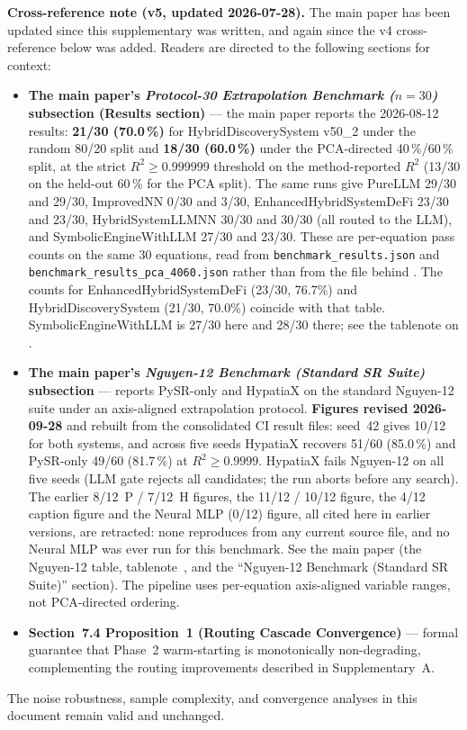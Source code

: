 \documentclass[twoside,11pt]{article}
\newcommand{\Rsq}{R^{2}}
\begin{document}
\medskip
\noindent\textbf{Cross-reference note (v5, updated 2026-07-28).}
The main paper has been updated since this supplementary was written, and
again since the v4 cross-reference below was added. Readers are directed
to the following sections for context:
\begin{itemize}
  \item \textbf{The main paper's \emph{Protocol-30 Extrapolation Benchmark ($n=30$)} subsection (Results section)} --- the main paper
    reports the 2026-08-12 results: \textbf{21/30 (70.0\,\%)} for
    HybridDiscoverySystem v50\_2 under the random 80/20 split and
    \textbf{18/30 (60.0\,\%)} under the PCA-directed 40\,\%/60\,\% split, at
    the strict $\Rsq \geq 0.999999$ threshold on the method-reported $\Rsq$ (13/30 on the
    held-out 60\,\% for the PCA split). The same
    runs give PureLLM 29/30 and 29/30, ImprovedNN 0/30 and 3/30,
    EnhancedHybridSystemDeFi 23/30 and 23/30, HybridSystemLLMNN 30/30 and
    30/30 (all routed to the LLM), and SymbolicEngineWithLLM 27/30 and 23/30.
    These are per-equation pass counts on the same 30 equations, read from
    \texttt{benchmark\_results.json} and \texttt{benchmark\_results\_pca\_4060.json}
    rather than from the file behind . The counts for
    EnhancedHybridSystemDeFi (23/30, 76.7\%) and HybridDiscoverySystem
    (21/30, 70.0\%) coincide with that table. SymbolicEngineWithLLM is 27/30
    here and 28/30 there; see the tablenote on .
  \item \textbf{The main paper's \emph{Nguyen-12 Benchmark (Standard SR Suite)} subsection} --- reports
    PySR-only and HypatiaX on the standard Nguyen-12 suite under an axis-aligned
    extrapolation protocol. \textbf{Figures revised 2026-09-28} and rebuilt from
    the consolidated CI result files: seed~42 gives 10/12 for both systems, and
    across five seeds HypatiaX recovers 51/60 (85.0\,\%) and PySR-only 49/60
    (81.7\,\%) at $\Rsq\ge0.9999$. HypatiaX fails Nguyen-12 on all five seeds
    (LLM gate rejects all candidates; the run aborts before any search).
    The earlier 8/12~P / 7/12~H figures, the 11/12 / 10/12 figure, the
    4/12 caption figure and the Neural MLP (0/12) figure, all cited here in
    earlier versions, are retracted: none reproduces from any current source
    file, and no Neural MLP was ever run for this benchmark. See the main paper
    (the Nguyen-12 table, tablenote~\ddag, and the ``Nguyen-12 Benchmark (Standard SR Suite)'' section). The
    pipeline uses per-equation axis-aligned variable ranges, not PCA-directed
    ordering.
  \item \textbf{Section~7.4 Proposition~1 (Routing Cascade Convergence)} --- formal
    guarantee that Phase~2 warm-starting is monotonically non-degrading,
    complementing the routing improvements described in Supplementary~A.
\end{itemize}
The noise robustness, sample complexity, and convergence analyses in this
document remain valid and unchanged.
\end{document}
